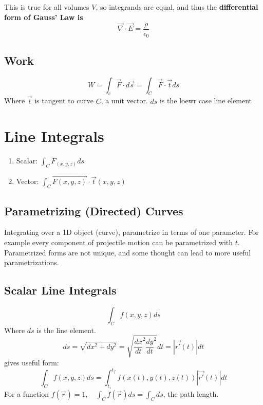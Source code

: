 This is true for all volumes $V$, so integrands are equal, and thus the \textbf{differential form of Gauss' Law is }
\begin{equation}
	\label{}
	\vec{\nabla}\cdot\vec{E}=\frac{\rho}{\epsilon_0}
\end{equation}

\subsection{Work}
\begin{equation}
	\label{}
	W=\int_{c}\vec{F}\cdot d\vec{s}=\int_C\vec{F}\cdot\vec{t}ds
\end{equation}
Where $ \vec{t} $ is tangent to curve $ C $, a unit vector. $ ds $ is the loewr case line element

\section{Line Integrals}
\begin{enumerate}
	\item Scalar: $ \int_C F_(x,y,z)ds $	
	\item Vector: $ \int_C\vec{F(x,y,z)}\cdot\vec{t}(x,y,z)$
\end{enumerate}

\subsection{Parametrizing (Directed) Curves}

Integrating over a 1D object (curve), parametrize in terms of one parameter. For example every component of projectile motion can be parametrized with $ t $.
Parametrized forms are not unique, and some thought can lead to more useful parametrizations. 

\subsection{Scalar Line Integrals}

\begin{equation}
	\label{}
	\int_{C}f(x,y,z)ds
\end{equation}
Where $ ds $ is the line element.
\begin{equation}
	\label{}
	ds=\sqrt{dx^2+dy^2}=\sqrt{\frac{dx}{dt}^2\frac{dy}{dt}^2}dt=|\vec{r'}(t)|dt
\end{equation}
gives useful form:
\begin{equation}
	\label{}
	\int_{C}f(x,y,z)ds=\int_{t_i}^{t_f}f(x(t),y(t),z(t))|\vec{r'}(t)|dt
\end{equation}
For a function $ f(\vec{r}) =1,\quad \int_{C}f(\vec{r})ds=\int_{C}ds $, the path length. 

